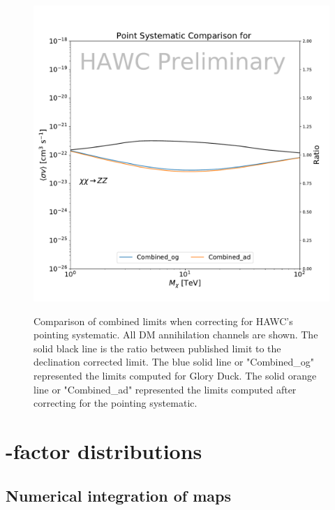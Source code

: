 \begin{figure}[h]
{        \includegraphics[scale=0.21]{figures/glory_duck/hawc/PointingSystematic_GD_Combined_zz.pdf}
    }
    \caption{Comparison of combined limits when correcting for HAWC's pointing systematic. All DM annihilation channels are shown. The solid black line is the ratio between published limit to the declination corrected limit. The blue solid line or "Combined\_og" represented the limits computed for Glory Duck. The solid orange line or "Combined\_ad" represented the limits computed after correcting for the pointing systematic.}
    \label{fig:pointing_systematic}
\end{figure}

\section{\J-factor distributions}\label{sec:gd_jfactor_systematic}

\subsection{Numerical integration of \GS maps}\label{sec:gd_jfacintegration}

